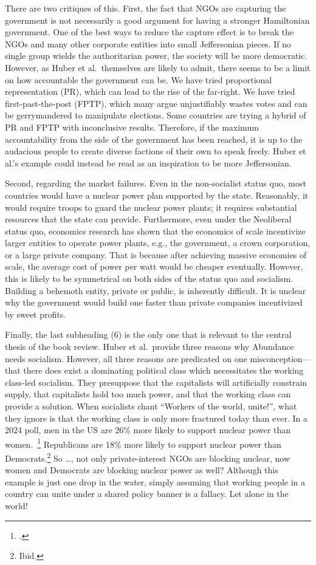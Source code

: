 \documentclass[12pt]{article}
\begin{document}
There are two critiques of this. First, the fact that NGOs are capturing the government is not necessarily a good argument for having a stronger Hamiltonian government. One of the best ways to reduce the capture effect is to break the NGOs and many other corporate entities into small Jeffersonian pieces. If no single group wields the authoritarian power, the society will be more democratic. However, as Huber et al.\ themselves are likely to admit, there seems to be a limit on how accountable the government can be. We have tried proportional representation (PR), which can lead to the rise of the far-right. We have tried first-past-the-post (FPTP), which many argue unjustifiably wastes votes and can be gerrymandered to manipulate elections. Some countries are trying a hybrid of PR and FPTP with inconclusive results. Therefore, if the maximum accountability from the side of the government has been reached, it is up to the audacious people to create diverse factions of their own to speak freely. Huber et al.'s example could instead be read as an inspiration to be more Jeffersonian.

Second, regarding the market failures. Even in the non-socialist status quo, most countries would have a nuclear power plan supported by the state. Reasonably, it would require troops to guard the nuclear power plants; it requires substantial resources that the state can provide. Furthermore, even under the Neoliberal status quo, economics research has shown that the economics of scale incentivize larger entities to operate power plants, e.g., the government, a crown corporation, or a large private company. That is because after achieving massive economies of scale, the average cost of power per watt would be cheaper eventually. However, this is likely to be symmetrical on both sides of the status quo and socialism. Building a behemoth entity, private or public, is inherently difficult. It is unclear why the government would build one faster than private companies incentivized by sweet profits.

Finally, the last subheading (6) is the only one that is relevant to the central thesis of the book review. Huber et al.\ provide three reasons why Abundance needs socialism. However, all three reasons are predicated on one misconception--- that there does exist a dominating political class which necessitates the working class-led socialism. They presuppose that the capitalists will artificially constrain supply, that capitalists hold too much power, and that the working class can provide a solution. When socialists chant ``Workers of the world, unite!'', what they ignore is that the working class is only more fractured today than ever. In a 2024 poll, men in the US are 26\% more likely to support nuclear power than women.~\footcite{leppertGrowingShareAmericans2024} Republicans are 18\% more likely to support nuclear power than Democrats.\footnote{Ibid.} So \dots, not only private-interest NGOs are blocking nuclear, now women and Democrats are blocking nuclear power as well? Although this example is just one drop in the water, simply assuming that working people in a country can unite under a shared policy banner is a fallacy. Let alone in the world!
\end{document}
